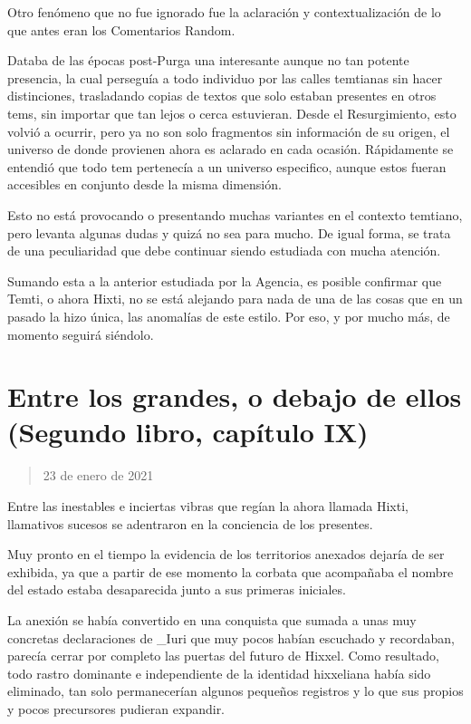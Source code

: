 \documentclass[
]{book}
\begin{document}
Otro fenómeno que no fue ignorado fue la aclaración y contextualización de lo que antes eran los Comentarios Random.

Databa de las épocas post-Purga una interesante aunque no tan potente presencia, la cual perseguía a todo individuo por las calles temtianas sin hacer distinciones, trasladando copias de textos que solo estaban presentes en otros tems, sin importar que tan lejos o cerca estuvieran. Desde el Resurgimiento, esto volvió a ocurrir, pero ya no son solo fragmentos sin información de su origen, el universo de donde provienen ahora es aclarado en cada ocasión. Rápidamente se entendió que todo tem pertenecía a un universo especifico, aunque estos fueran accesibles en conjunto desde la misma dimensión.

Esto no está provocando o presentando muchas variantes en el contexto temtiano, pero levanta algunas dudas y quizá no sea para mucho. De igual forma, se trata de una peculiaridad que debe continuar siendo estudiada con mucha atención.

Sumando esta a la anterior estudiada por la Agencia, es posible confirmar que Temti, o ahora Hixti, no se está alejando para nada de una de las cosas que en un pasado la hizo única, las anomalías de este estilo. Por eso, y por mucho más, de momento seguirá siéndolo.

\hypertarget{entre-los-grandes-o-debajo-de-ellos-segundo-libro-capuxedtulo-ix}{%
\section{Entre los grandes, o debajo de ellos (Segundo libro, capítulo IX)}\label{entre-los-grandes-o-debajo-de-ellos-segundo-libro-capuxedtulo-ix}}

\begin{quote}
23 de enero de 2021
\end{quote}

Entre las inestables e inciertas vibras que regían la ahora llamada Hixti, llamativos sucesos se adentraron en la conciencia de los presentes.

Muy pronto en el tiempo la evidencia de los territorios anexados dejaría de ser exhibida, ya que a partir de ese momento la corbata que acompañaba el nombre del estado estaba desaparecida junto a sus primeras iniciales.

La anexión se había convertido en una conquista que sumada a unas muy concretas declaraciones de \_Iuri que muy pocos habían escuchado y recordaban, parecía cerrar por completo las puertas del futuro de Hixxel. Como resultado, todo rastro dominante e independiente de la identidad hixxeliana había sido eliminado, tan solo permanecerían algunos pequeños registros y lo que sus propios y pocos precursores pudieran expandir.
\end{document}
